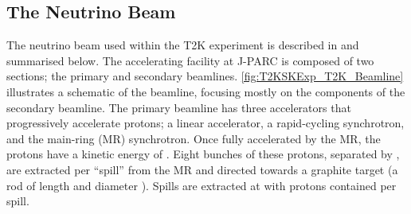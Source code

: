 \subsection{The Neutrino Beam}
\label{subsec:T2KSKExp_T2K_NeutrinoBeam}

The neutrino beam used within the T2K experiment is described in \cite{t2k_det, Abe_2013} and summarised below. The accelerating facility at J-PARC is composed of two sections; the primary and secondary beamlines. \autoref{fig:T2KSKExp_T2K_Beamline} illustrates a schematic of the beamline, focusing mostly on the components of the secondary beamline. The primary beamline has three accelerators that progressively accelerate protons; a linear accelerator, a rapid-cycling synchrotron, and the main-ring (MR) synchrotron. Once fully accelerated by the MR, the protons have a kinetic energy of . Eight bunches of these protons, separated by , are extracted per ``spill'' from the MR and directed towards a graphite target (a rod of length  and diameter ).
Spills are extracted at  with  protons contained per spill.

